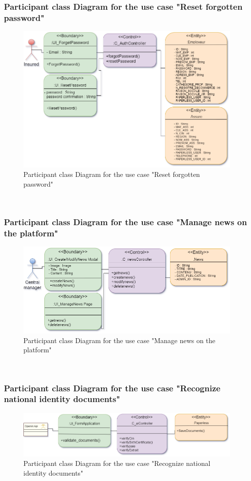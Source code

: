 \subsubsection{Participant class Diagram for the use case "Reset forgotten password"}
\begin{figure}[h!]
    \centering
    \includegraphics[width=1\textwidth]{figures/dc reset my forgoten password.png}
    \caption{Participant class Diagram for the use case "Reset forgotten password"}
\end{figure}\
\subsubsection{Participant class Diagram for the use case "Manage news on the platform"}
\begin{figure}[h]
    \centering
    \includegraphics[width=1\textwidth]{figures/dc manages News.png}
    \caption{Participant class Diagram for the use case "Manage news on the platform"}
\end{figure}\
\subsubsection{Participant class Diagram for the use case "Recognize national identity documents"}
\begin{figure}[h]
    \centering
    \includegraphics[width=1\textwidth]{figures/dc validate national identity documents.png}
    \caption{Participant class Diagram for the use case "Recognize national identity documents"}
\end{figure}\

